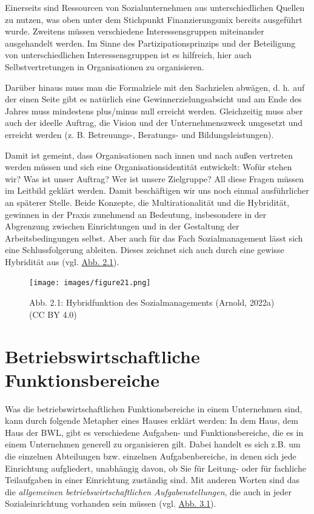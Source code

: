 \documentclass[
  letterpaper,
]{book}
\begin{document}
Einerseits sind Ressourcen von Sozialunternehmen aus unterschiedlichen
Quellen zu nutzen, was oben unter dem Stichpunkt Finanzierungsmix
bereits ausgeführt wurde. Zweitens müssen verschiedene
Interessensgruppen miteinander ausgehandelt werden. Im Sinne des
Partizipationsprinzips und der Beteiligung von unterschiedlichen
Interessensgruppen ist es hilfreich, hier auch Selbstvertretungen in
Organisationen zu organisieren.

Darüber hinaus muss man die Formalziele mit den Sachzielen abwägen, d.
h. auf der einen Seite gibt es natürlich eine Gewinnerzielungsabsicht
und am Ende des Jahres muss mindestens plus/minus null erreicht werden.
Gleichzeitig muss aber auch der ideelle Auftrag, die Vision und der
Unternehmenszweck umgesetzt und erreicht werden (z. B. Betreuungs-,
Beratungs- und Bildungsleistungen).

Damit ist gemeint, dass Organisationen nach innen und nach außen
vertreten werden müssen und sich eine Organisationsidentität entwickelt:
Wofür stehen wir? Was ist unser Auftrag? Wer ist unsere Zielgruppe? All
diese Fragen müssen im Leitbild geklärt werden. Damit beschäftigen wir
uns noch einmal ausführlicher an späterer Stelle. Beide Konzepte, die
Multirationalität und die Hybridität, gewinnen in der Praxis zunehmend
an Bedeutung, insbesondere in der Abgrenzung zwischen Einrichtungen und
in der Gestaltung der Arbeitsbedingungen selbst. Aber auch für das Fach
Sozialmanagement lässt sich eine Schlussfolgerung ableiten. Dieses
zeichnet sich auch durch eine gewisse Hybridität aus (vgl.
\hyperref[figure21]{Abb. 2.1}).

\begin{figure}

\texttt{[image: images/figure21.png]} \hfill{}

\caption{Abb. 2.1: Hybridfunktion des Sozialmanagements (Arnold, 2022a)
(CC BY 4.0)}

\end{figure}%

\chapter{Betriebswirtschaftliche
Funktionsbereiche}\label{funktionsbereiche}

Was die betriebswirtschaftlichen Funktionsbereiche in einem Unternehmen
sind, kann durch folgende Metapher eines Hauses erklärt werden: In dem
Haus, dem Haus der BWL, gibt es verschiedene Aufgaben- und
Funktionsbereiche, die es in einem Unternehmen generell zu organisieren
gilt. Dabei handelt es sich z.B. um die einzelnen Abteilungen bzw.
einzelnen Aufgabenbereiche, in denen sich jede Einrichtung aufgliedert,
unabhängig davon, ob Sie für Leitung- oder für fachliche Teilaufgaben in
einer Einrichtung zuständig sind. Mit anderen Worten sind das die
\emph{allgemeinen betriebswirtschaftlichen Aufgabenstellungen}, die auch
in jeder Sozialeinrichtung vorhanden sein müssen (vgl.
\hyperref[figure31]{Abb. 3.1}).
\end{document}
